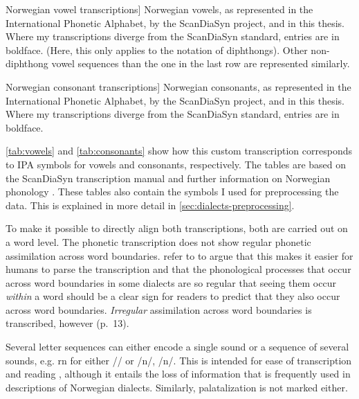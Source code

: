 \begin{table}[ht]

\caption
[Norwegian vowel transcriptions]
{Norwegian vowels, as represented in the International Phonetic Alphabet, by the ScanDiaSyn project, and in this thesis. 
Where my transcriptions diverge from the ScanDiaSyn standard, entries are in boldface.
(Here, this only applies to the notation of diphthongs).
Other non-diphthong vowel sequences than the one in the last row are represented similarly.}
\label{tab:vowels}
\end{table}

\begin{table}[ht]

\caption
[Norwegian consonant transcriptions]
{Norwegian consonants, as represented in the International Phonetic Alphabet, by the ScanDiaSyn project, and in this thesis. 
Where my transcriptions diverge from the ScanDiaSyn standard, entries are in boldface.}
\label{tab:consonants}
\end{table}


\autoref{tab:vowels} and \autoref{tab:consonants} show how this custom transcription corresponds to IPA symbols for vowels and consonants, respectively.
The tables are based on the ScanDiaSyn transcription manual \citep[pp.~10--13]{johannessen2009transkripsjonsrettleiing} and further information on Norwegian phonology \citep[pp.~13, 19--20, 22--25]{kristoffersen2000phonology}.
These tables also contain the symbols I used for preprocessing the data. This is explained in more detail in \autoref{sec:dialects-preprocessing}. 

To make it possible to directly align both transcriptions, both are carried out on a word level.
The phonetic transcription does not show regular phonetic assimilation across word boundaries.
\citet{johannessen2009transkripsjonsrettleiing} refer to \citet[p.~21]{papazian2005norsk} to argue that this makes it easier for humans to parse the transcription and that the phonological processes that occur across word boundaries in some dialects are so regular that seeing them occur \textit{within} a word should be a clear sign for readers to predict that they also occur across word boundaries.
\textit{Irregular} assimilation across word boundaries is transcribed, however (p.~13).

Several letter sequences can either encode a single sound or a sequence of several sounds, e.g. \textlangle{}rn\textrangle{} for either /{\textrtailn}/ or /{\textinvscr}n/, /{\textfishhookr}n/.
This is intended for ease of transcription and reading \cite[p.~11]{johannessen2009transkripsjonsrettleiing}, although it entails the loss of information that is frequently used in descriptions of Norwegian dialects.
Similarly, palatalization is not marked either.


